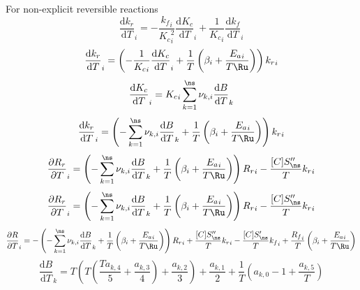 \documentclass[a4paper,10pt]{article}
\begin{document}
For non-explicit reversible reactions
\begin{dmath} \frac{\text{d} {k_r} }{\text{d} T }_{i} = - \frac{{k_f}_{i}}{{K_c}_{i}^{2}} \frac{\text{d} {K_c} }{\text{d} T }_{i} + \frac{1}{{K_c}_{i}} \frac{\text{d} {k_f} }{\text{d} T }_{i}\end{dmath} 
\begin{dmath} \frac{\text{d} {k_r} }{\text{d} T }_{i} = \left(- \frac{1}{{K_c}_{i}} \frac{\text{d} {K_c} }{\text{d} T }_{i} + \frac{1}{T} \left(\beta_{i} + \frac{{E_{a}}_{i}}{T \Ru}\right)\right) {k_r}_{i}\end{dmath} 
\begin{dmath} \frac{\text{d} {K_c} }{\text{d} T }_{i} = {K_c}_{i} \sum_{k=1}^{\ns} \nu_{k,i} \frac{\text{d} B }{\text{d} T }_{k}\end{dmath} 
\begin{dmath} \frac{\text{d} {k_r} }{\text{d} T }_{i} = \left(- \sum_{k=1}^{\ns} \nu_{k,i} \frac{\text{d} B }{\text{d} T }_{k} + \frac{1}{T} \left(\beta_{i} + \frac{{E_{a}}_{i}}{T \Ru}\right)\right) {k_r}_{i}\end{dmath} 
\begin{dmath} \frac{\partial {R_r} }{\partial T }_{i} = \left(- \sum_{k=1}^{\ns} \nu_{k,i} \frac{\text{d} B }{\text{d} T }_{k} + \frac{1}{T} \left(\beta_{i} + \frac{{E_{a}}_{i}}{T \Ru}\right)\right) {R_r}_{i} - \frac{[C] S^{\prime\prime}_{\ns}}{T} {k_r}_{i}\end{dmath} 
\begin{dmath} \frac{\partial {R_r} }{\partial T }_{i} = \left(- \sum_{k=1}^{\ns} \nu_{k,i} \frac{\text{d} B }{\text{d} T }_{k} + \frac{1}{T} \left(\beta_{i} + \frac{{E_{a}}_{i}}{T \Ru}\right)\right) {R_r}_{i} - \frac{[C] S^{\prime\prime}_{\ns}}{T} {k_r}_{i}\end{dmath} 
\begin{dmath} \frac{\partial R }{\partial T }_{i} = - \left(- \sum_{k=1}^{\ns} \nu_{k,i} \frac{\text{d} B }{\text{d} T }_{k} + \frac{1}{T} \left(\beta_{i} + \frac{{E_{a}}_{i}}{T \Ru}\right)\right) {R_r}_{i} + \frac{[C] S^{\prime\prime}_{\ns}}{T} {k_r}_{i} - \frac{[C] S^{\prime}_{\ns}}{T} {k_f}_{i} + \frac{{R_f}_{i}}{T} \left(\beta_{i} + \frac{{E_{a}}_{i}}{T \Ru}\right)\end{dmath} 
\begin{dmath} \frac{\text{d} B }{\text{d} T }_{k} = T \left(T \left(\frac{T a_{k,4}}{5} + \frac{a_{k,3}}{4}\right) + \frac{a_{k,2}}{3}\right) + \frac{a_{k,1}}{2} + \frac{1}{T} \left(a_{k,0} - 1 + \frac{a_{k,5}}{T}\right)\end{dmath} 
\end{document}
